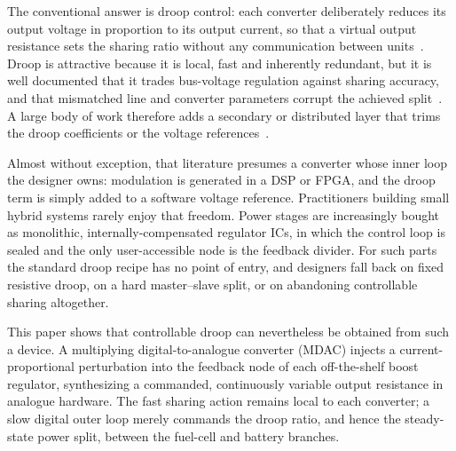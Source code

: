 The conventional answer is droop control: each converter deliberately reduces
its output voltage in proportion to its output current, so that a virtual output
resistance sets the sharing ratio without any communication between
units~\cite{guerrero2011hierarchical,tah2016adaptive}. Droop is attractive because
it is local, fast and inherently redundant, but it is well documented that it
trades bus-voltage regulation against sharing accuracy, and that mismatched line
and converter parameters corrupt the achieved split~\cite{anand2013distributed,lu2014adaptive}.
A large body of work therefore adds a secondary or distributed layer that trims
the droop coefficients or the voltage
references~\cite{nasirian2015cooperative,tucci2018plugandplay,kumar2020distributed}.

Almost without exception, that literature presumes a converter whose inner loop
the designer owns: modulation is generated in a DSP or FPGA, and the droop term
is simply added to a software voltage reference. Practitioners building small
hybrid systems rarely enjoy that freedom. Power stages are increasingly bought as
monolithic, internally-compensated regulator ICs, in which the control loop is
sealed and the only user-accessible node is the feedback divider. For such parts
the standard droop recipe has no point of entry, and designers fall back on
fixed resistive droop, on a hard master--slave split, or on abandoning
controllable sharing altogether.

This paper shows that controllable droop can nevertheless be obtained from such
a device. A multiplying digital-to-analogue converter (MDAC) injects a
current-proportional perturbation into the feedback node of each off-the-shelf
boost regulator, synthesizing a commanded, continuously variable output
resistance in analogue hardware. The fast sharing action remains local to each
converter; a slow digital outer loop merely commands the droop ratio, and hence
the steady-state power split, between the fuel-cell and battery branches.

